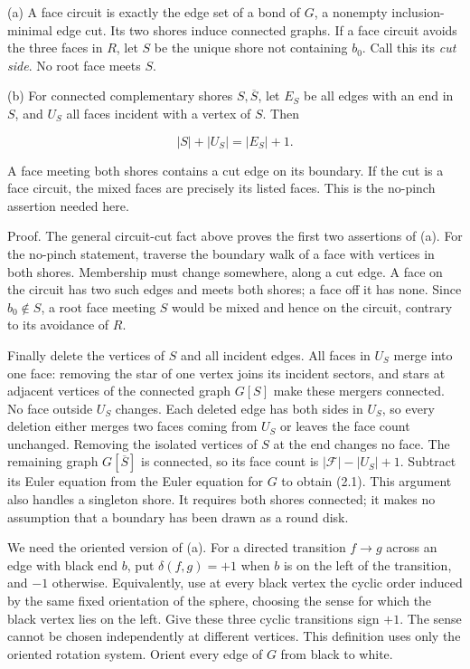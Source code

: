 \documentclass[a4paper,11pt]{amsart}
\begin{document}
(a) A face circuit is exactly the edge set of a bond of $G$, a nonempty inclusion-minimal edge cut. Its two shores induce connected graphs. If a face circuit avoids the three faces in $R$, let $S$ be the unique shore not containing $b_0$. Call this its \emph{cut side}. No root face meets $S$.

(b) For connected complementary shores $S,\allowbreak \overline S$, let $E_S$ be all edges with an end in $S$, and $U_S$ all faces incident with a vertex of $S$. Then

\begin{equation*}
|S|+|U_S|=|E_S|+1.                                      \tag{2.1}
\end{equation*}

A face meeting both shores contains a cut edge on its boundary. If the cut is a face circuit, the mixed faces are precisely its listed faces. This is the no-pinch assertion needed here.

Proof. The general circuit-cut fact above proves the first two assertions of (a). For the no-pinch statement, traverse the boundary walk of a face with vertices in both shores. Membership must change somewhere, along a cut edge. A face on the circuit has two such edges and meets both shores; a face off it has none. Since $b_0\notin S$, a root face meeting $S$ would be mixed and hence on the circuit, contrary to its avoidance of $R$.

Finally delete the vertices of $S$ and all incident edges. All faces in $U_S$ merge into one face: removing the star of one vertex joins its incident sectors, and stars at adjacent vertices of the connected graph $G[S]$ make these mergers connected. No face outside $U_S$ changes. Each deleted edge has both sides in $U_S$, so every deletion either merges two faces coming from $U_S$ or leaves the face count unchanged. Removing the isolated vertices of $S$ at the end changes no face. The remaining graph $G[\overline S]$ is connected, so its face count is $|\mathcal F|-|U_S|+1$. Subtract its Euler equation from the Euler equation for $G$ to obtain (2.1). This argument also handles a singleton shore. It requires both shores connected; it makes no assumption that a boundary has been drawn as a round disk.

We need the oriented version of (a). For a directed transition $f\to g$ across an edge with black end $b$, put $\delta(f,\allowbreak g)=+1$ when $b$ is on the left of the transition, and $-1$ otherwise. Equivalently, use at every black vertex the cyclic order induced by the same fixed orientation of the sphere, choosing the sense for which the black vertex lies on the left. Give these three cyclic transitions sign $+1$. The sense cannot be chosen independently at different vertices. This definition uses only the oriented rotation system. Orient every edge of $G$ from black to white.
\end{document}
